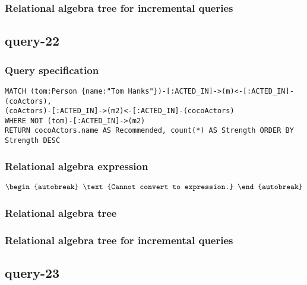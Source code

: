 
\subsubsection*{Relational algebra tree for incremental queries}

\subsection{query-22}

\subsubsection*{Query specification}

\begin{lstlisting}
MATCH (tom:Person {name:"Tom Hanks"})-[:ACTED_IN]->(m)<-[:ACTED_IN]-(coActors),
(coActors)-[:ACTED_IN]->(m2)<-[:ACTED_IN]-(cocoActors)
WHERE NOT (tom)-[:ACTED_IN]->(m2)
RETURN cocoActors.name AS Recommended, count(*) AS Strength ORDER BY Strength DESC
\end{lstlisting}

\subsubsection*{Relational algebra expression}

\begin{align*}
\begin{autobreak}
\text{Cannot convert to expression.}
\end{autobreak}
\end{align*}

\subsubsection*{Relational algebra tree}


\subsubsection*{Relational algebra tree for incremental queries}

\subsection{query-23}

